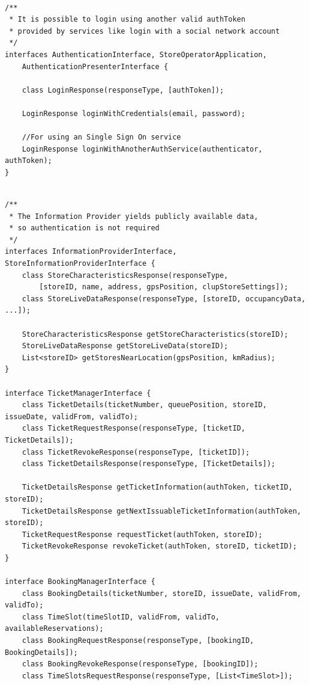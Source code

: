 \vfill

\begin{lstlisting}

/**
 * It is possible to login using another valid authToken 
 * provided by services like login with a social network account 
 */
interfaces AuthenticationInterface, StoreOperatorApplication, 
    AuthenticationPresenterInterface {
                
    class LoginResponse(responseType, [authToken]);

    LoginResponse loginWithCredentials(email, password);

    //For using an Single Sign On service 
    LoginResponse loginWithAnotherAuthService(authenticator, authToken);
}

\end{lstlisting}
\clearpage
\begin{lstlisting}

/**
 * The Information Provider yields publicly available data, 
 * so authentication is not required
 */
interfaces InformationProviderInterface, StoreInformationProviderInterface {
    class StoreCharacteristicsResponse(responseType, 
        [storeID, name, address, gpsPosition, clupStoreSettings]);
    class StoreLiveDataResponse(responseType, [storeID, occupancyData, ...]);

    StoreCharacteristicsResponse getStoreCharacteristics(storeID);
    StoreLiveDataResponse getStoreLiveData(storeID);
    List<storeID> getStoresNearLocation(gpsPosition, kmRadius);
}

interface TicketManagerInterface {
    class TicketDetails(ticketNumber, queuePosition, storeID, issueDate, validFrom, validTo);
    class TicketRequestResponse(responseType, [ticketID, TicketDetails]);
    class TicketRevokeResponse(responseType, [ticketID]);
    class TicketDetailsResponse(responseType, [TicketDetails]);

    TicketDetailsResponse getTicketInformation(authToken, ticketID, storeID);
    TicketDetailsResponse getNextIssuableTicketInformation(authToken, storeID);
    TicketRequestResponse requestTicket(authToken, storeID);
    TicketRevokeResponse revokeTicket(authToken, storeID, ticketID);
}

interface BookingManagerInterface {
    class BookingDetails(ticketNumber, storeID, issueDate, validFrom, validTo);
    class TimeSlot(timeSlotID, validFrom, validTo, availableReservations);
    class BookingRequestResponse(responseType, [bookingID, BookingDetails]);
    class BookingRevokeResponse(responseType, [bookingID]);
    class TimeSlotsRequestResponse(responseType, [List<TimeSlot>]);


\end{lstlisting}
